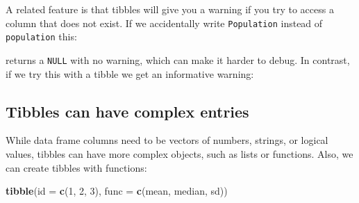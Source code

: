 \documentclass[
]{krantz}
\newenvironment{Shaded}{\begin{snugshade}}{\end{snugshade}}
\newcommand{\CommentTok}[1]{\textcolor[rgb]{0.37,0.37,0.37}{\textit{#1}}}
\newcommand{\DataTypeTok}[1]{\textcolor[rgb]{0.27,0.27,0.27}{#1}}
\newcommand{\DecValTok}[1]{\textcolor[rgb]{0.06,0.06,0.06}{#1}}
\newcommand{\KeywordTok}[1]{\textcolor[rgb]{0.27,0.27,0.27}{\textbf{#1}}}
\newcommand{\NormalTok}[1]{#1}
\newcommand{\OperatorTok}[1]{\textcolor[rgb]{0.43,0.43,0.43}{\textbf{#1}}}
\begin{document}
\begin{Shaded}
\end{Shaded}

A related feature is that tibbles will give you a warning if you try to access a column that does not exist. If we accidentally write \texttt{Population} instead of \texttt{population} this:

\begin{Shaded}
\end{Shaded}

returns a \texttt{NULL} with no warning, which can make it harder to debug. In contrast, if we try this with a tibble we get an informative warning:

\begin{Shaded}
\end{Shaded}

\hypertarget{tibbles-can-have-complex-entries}{%
\subsection{Tibbles can have complex entries}\label{tibbles-can-have-complex-entries}}

While data frame columns need to be vectors of numbers, strings, or logical values, tibbles can have more complex objects, such as lists or functions. Also, we can create tibbles with functions:

\begin{Shaded}
\begin{Highlighting}[]
\KeywordTok{tibble}\NormalTok{(}\DataTypeTok{id =} \KeywordTok{c}\NormalTok{(}\DecValTok{1}\NormalTok{, }\DecValTok{2}\NormalTok{, }\DecValTok{3}\NormalTok{), }\DataTypeTok{func =} \KeywordTok{c}\NormalTok{(mean, median, sd))}
\end{Highlighting}
\end{Shaded}
\end{document}
